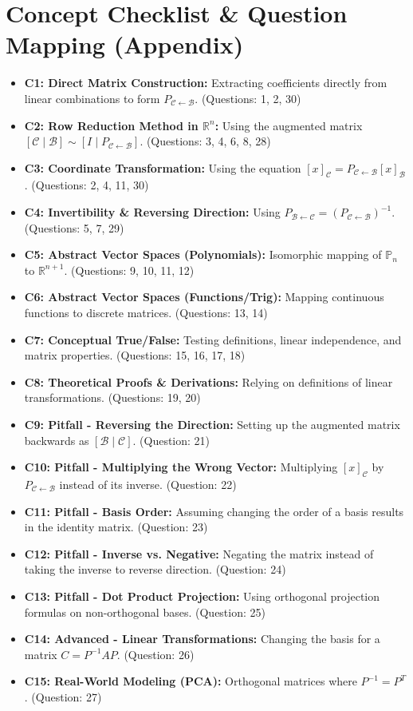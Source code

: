 \documentclass[11pt]{article}
\begin{document}
\newpage

\section{Concept Checklist \& Question Mapping (Appendix)}
\begin{itemize}
    \item \textbf{C1: Direct Matrix Construction:} Extracting coefficients directly from linear combinations to form $P_{\mathcal{C} \leftarrow \mathcal{B}}$. (Questions: 1, 2, 30)
    \item \textbf{C2: Row Reduction Method in $\mathbb{R}^n$:} Using the augmented matrix $[\mathcal{C} \mid \mathcal{B}] \sim [I \mid P_{\mathcal{C} \leftarrow \mathcal{B}}]$. (Questions: 3, 4, 6, 8, 28)
    \item \textbf{C3: Coordinate Transformation:} Using the equation $[x]_{\mathcal{C}} = P_{\mathcal{C} \leftarrow \mathcal{B}}[x]_{\mathcal{B}}$. (Questions: 2, 4, 11, 30)
    \item \textbf{C4: Invertibility \& Reversing Direction:} Using $P_{\mathcal{B} \leftarrow \mathcal{C}} = (P_{\mathcal{C} \leftarrow \mathcal{B}})^{-1}$. (Questions: 5, 7, 29)
    \item \textbf{C5: Abstract Vector Spaces (Polynomials):} Isomorphic mapping of $\mathbb{P}_n$ to $\mathbb{R}^{n+1}$. (Questions: 9, 10, 11, 12)
    \item \textbf{C6: Abstract Vector Spaces (Functions/Trig):} Mapping continuous functions to discrete matrices. (Questions: 13, 14)
    \item \textbf{C7: Conceptual True/False:} Testing definitions, linear independence, and matrix properties. (Questions: 15, 16, 17, 18)
    \item \textbf{C8: Theoretical Proofs \& Derivations:} Relying on definitions of linear transformations. (Questions: 19, 20)
    \item \textbf{C9: Pitfall - Reversing the Direction:} Setting up the augmented matrix backwards as $[\mathcal{B} \mid \mathcal{C}]$. (Question: 21)
    \item \textbf{C10: Pitfall - Multiplying the Wrong Vector:} Multiplying $[x]_{\mathcal{C}}$ by $P_{\mathcal{C} \leftarrow \mathcal{B}}$ instead of its inverse. (Question: 22)
    \item \textbf{C11: Pitfall - Basis Order:} Assuming changing the order of a basis results in the identity matrix. (Question: 23)
    \item \textbf{C12: Pitfall - Inverse vs. Negative:} Negating the matrix instead of taking the inverse to reverse direction. (Question: 24)
    \item \textbf{C13: Pitfall - Dot Product Projection:} Using orthogonal projection formulas on non-orthogonal bases. (Question: 25)
    \item \textbf{C14: Advanced - Linear Transformations:} Changing the basis for a matrix $C = P^{-1}AP$. (Question: 26)
    \item \textbf{C15: Real-World Modeling (PCA):} Orthogonal matrices where $P^{-1} = P^T$. (Question: 27)
\end{itemize}
\end{document}
